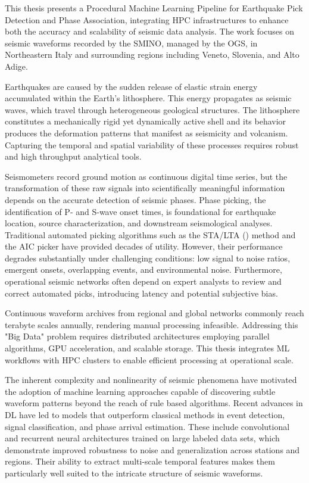 \label{chap:Introduction}
This thesis presents a Procedural Machine Learning Pipeline for Earthquake Pick
Detection and Phase Association, integrating \ac{HPC} infrastructures to
enhance both the accuracy and scalability of seismic data analysis. The work
focuses on seismic waveforms recorded by the \ac{SMINO}, managed by the
\ac{OGS}, in Northeastern Italy and surrounding regions including Veneto,
Slovenia, and Alto Adige.

Earthquakes are caused by the sudden release of elastic strain energy
accumulated within the Earth's lithosphere. This energy propagates as seismic
waves, which travel through heterogeneous geological structures. The
lithosphere constitutes a mechanically rigid yet dynamically active shell and
its behavior produces the deformation patterns that manifest as seismicity and
volcanism. Capturing the temporal and spatial variability of these processes
requires robust and high throughput analytical tools.

Seismometers record ground motion as continuous digital time series, but the
transformation of these raw signals into scientifically meaningful information
depends on the accurate detection of seismic phases. Phase picking, the
identification of P- and S-wave onset times, is foundational for earthquake
location, source characterization, and downstream seismological analyses.
Traditional automated picking algorithms such as the \ac{STA/LTA}
(\cite{STALTA}) method and the \ac{AIC} picker have provided decades of
utility. However, their performance degrades substantially under challenging
conditions: low signal to noise ratios, emergent onsets, overlapping events,
and environmental noise. Furthermore, operational seismic networks often depend
on expert analysts to review and correct automated picks, introducing latency
and potential subjective bias.

Continuous waveform archives from regional and global networks commonly reach
terabyte scales annually, rendering manual processing infeasible. Addressing
this "Big Data" problem requires distributed architectures employing parallel
algorithms, GPU acceleration, and scalable storage. This thesis integrates
\ac{ML} workflows with \ac{HPC} clusters to enable efficient processing at
operational scale.

The inherent complexity and nonlinearity of seismic phenomena have motivated
the adoption of machine learning approaches capable of discovering subtle
waveform patterns beyond the reach of rule based algorithms. Recent advances in
\ac{DL} have led to models that outperform classical methods in event
detection, signal classification, and phase arrival estimation. These include
convolutional and recurrent neural architectures trained on large labeled
data sets, which demonstrate improved robustness to noise and generalization
across stations and regions. Their ability to extract multi-scale temporal
features makes them particularly well suited to the intricate structure of
seismic waveforms.

